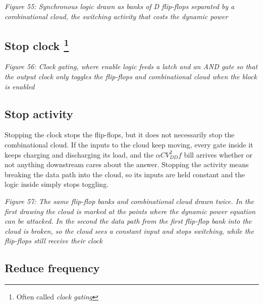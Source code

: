 {
\centering
{}
}

\emph{Figure 55: Synchronous logic drawn as banks of D flip-flops
separated by a combinational cloud, the switching activity that costs
the dynamic power}

\subsection[Stop clock ]{\texorpdfstring{Stop clock
\footnote{Often called \emph{clock gating}}}{Stop clock }}\label{stop-clock-3}


{
\centering
{}
}

\emph{Figure 56: Clock gating, where enable logic feeds a latch and an
AND gate so that the output clock only toggles the flip-flops and
combinational cloud when the block is enabled}

\subsection{Stop activity}\label{stop-activity}

Stopping the clock stops the flip-flops, but it does not necessarily
stop the combinational cloud. If the inputs to the cloud keep moving,
every gate inside it keeps charging and discharging its load, and the
\(\alpha C V_{DD}^2 f\) bill arrives whether or not anything downstream
cares about the answer. Stopping the activity means breaking the data
path into the cloud, so its inputs are held constant and the logic
inside simply stops toggling.


{
\centering
{}
}


{
\centering
{}
}

\emph{Figure 57: The same flip-flop banks and combinational cloud drawn
twice. In the first drawing the cloud is marked at the points where the
dynamic power equation can be attacked. In the second the data path from
the first flip-flop bank into the cloud is broken, so the cloud sees a
constant input and stops switching, while the flip-flops still receive
their clock}

\subsection{Reduce frequency}\label{reduce-frequency}


{
\centering
{}
}

